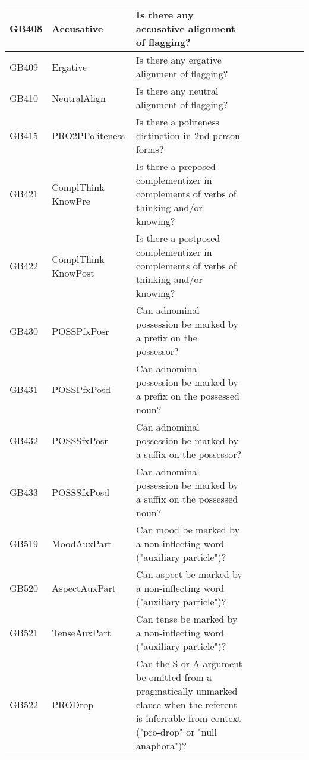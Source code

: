 \documentclass[a4paper,10pt]{article} %
\begin{document}
\begin{landscape}
\begin{longtable}{| l | p{4cm}| p{12cm}|p{2cm}|p{2cm}|p{2cm}|p{2cm}|p{2cm}|p{2cm}|}
GB408 & Accusative&Is there any accusative alignment of flagging?\\ \hline
GB409 & Ergative&Is there any ergative alignment of flagging?\\ \hline
GB410 & NeutralAlign&Is there any neutral alignment of flagging?\\ \hline
GB415 & PRO2PPoliteness&Is there a politeness distinction in 2nd person forms?\\ \hline
GB421 & ComplThink KnowPre&Is there a preposed complementizer in complements of verbs of thinking and/or knowing?\\ \hline
GB422 & ComplThink KnowPost&Is there a postposed complementizer in complements of verbs of thinking and/or knowing?\\ \hline
GB430 & POSSPfxPosr&Can adnominal possession be marked by a prefix on the possessor?\\ \hline
GB431 & POSSPfxPosd&Can adnominal possession be marked by a prefix on the possessed noun?\\ \hline
GB432 & POSSSfxPosr &Can adnominal possession be marked by a suffix on the possessor?\\ \hline
GB433 & POSSSfxPosd&Can adnominal possession be marked by a suffix on the possessed noun?\\ \hline
GB519 & MoodAuxPart&Can mood be marked by a non-inflecting word ("auxiliary particle")?\\ \hline
GB520 & AspectAuxPart&Can aspect be marked by a non-inflecting word ("auxiliary particle")?\\ \hline
GB521 & TenseAuxPart&Can tense be marked by a non-inflecting word ("auxiliary particle")?\\ \hline
GB522 & PRODrop&Can the S or A argument be omitted from a pragmatically unmarked clause when the referent is inferrable from context ("pro-drop" or "null anaphora")? \\ \hline



 \end{longtable}
\end{landscape}
\newpage






\newpage
\end{document}
